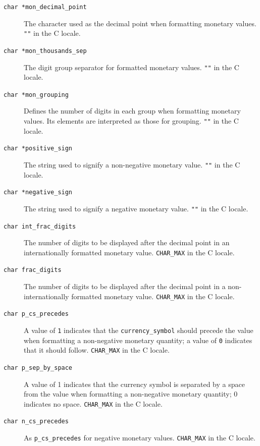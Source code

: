 \begin{description}
   \item[\texttt{char *mon\_decimal\_point}] The character used as the decimal point  when  formatting
    monetary values.  \texttt{""} in the C locale.

   \item[\texttt{char *mon\_thousands\_sep}] The digit group separator for formatted monetary  values.
    \texttt{""} in the C locale.

   \item[\texttt{char *mon\_grouping}] Defines  the  number  of  digits  in  each   group   when
    formatting monetary values.  Its elements are interpreted
    as those for grouping.  \texttt{""} in the C locale.

   \item[\texttt{char *positive\_sign}] The string used to signify a non-negative monetary value.
    \texttt{""} in the C locale.

   \item[\texttt{char *negative\_sign}] The string used to signify a negative monetary value.  \texttt{""}
    in the C locale.

   \item[\texttt{char int\_frac\_digits}] The number of digits to be displayed  after  the  decimal
    point  in  an  internationally  formatted monetary value.
    \texttt{CHAR\_MAX} in the C locale.

   \item[\texttt{char frac\_digits}] The number of digits to be displayed  after  the  decimal
    point  in a non-internationally formatted monetary value.
    \texttt{CHAR\_MAX} in the C locale.

   \item[\texttt{char p\_cs\_precedes}] A value of \texttt{1} indicates that the
    \texttt{currency\_symbol} should precede the value when formatting a
    non-negative monetary quantity; a value of \texttt{0} indicates that it
    should follow.  \texttt{CHAR\_MAX} in the C locale.

   \item[\texttt{char p\_sep\_by\_space}] A value of  1  indicates  that  the  currency  symbol  is
    separated  by  a  space  from the value when formatting a
    non-negative monetary quantity;  0  indicates  no  space.
    \texttt{CHAR\_MAX} in the C locale.

  \item[\texttt{char n\_cs\_precedes}]
    As \texttt{p\_cs\_precedes} for negative monetary  values.
    \texttt{CHAR\_MAX} in the C locale.


\end{description}
